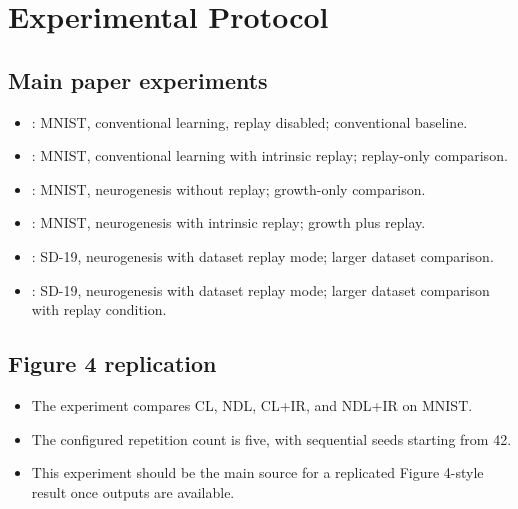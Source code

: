 \section{Experimental Protocol}

\subsection{Main paper experiments}
\begin{itemize}
  \item {}: MNIST, conventional learning, replay disabled; conventional baseline.
  \item {}: MNIST, conventional learning with intrinsic replay; replay-only comparison.
  \item {}: MNIST, neurogenesis without replay; growth-only comparison.
  \item {}: MNIST, neurogenesis with intrinsic replay; growth plus replay.
  \item {}: SD-19, neurogenesis with dataset replay mode; larger dataset comparison.
  \item {}: SD-19, neurogenesis with dataset replay mode; larger dataset comparison with replay condition.
\end{itemize}

\subsection{Figure 4 replication}
\begin{itemize}
  \item The  experiment compares CL, NDL, CL+IR, and NDL+IR on MNIST.
  \item The configured repetition count is five, with sequential seeds starting from 42.
  \item This experiment should be the main source for a replicated Figure 4-style result once outputs are available.
\end{itemize}

